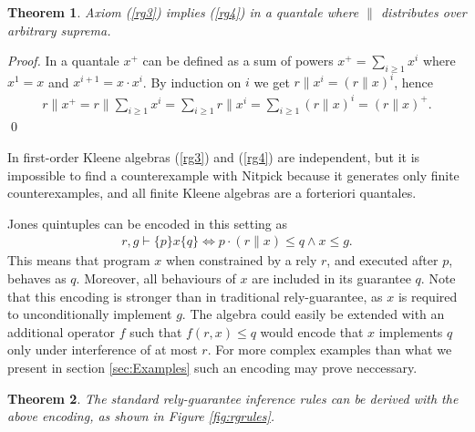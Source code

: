 \documentclass{llncs}
\newtheorem{thm}{Theorem}
\begin{document}
\begin{thm}
  Axiom (\ref{rg3}) implies (\ref{rg4}) in a quantale
  where $\|$ distributes over arbitrary suprema.
\end{thm}
\begin{proof}
  In a quantale $x^+$ can be defined as a sum of powers
  $x^+=\sum_{i\ge 1} x^i$ where $x^1=x$ and $x^{i+1}=x\cdot x^i$. By
  induction on $i$ we get $r\|x^i = (r\|x)^i$, hence
  \begin{align*}
    r\|x^+ = r\|\sum_{i\ge 1} x^i = \sum_{i\ge 1} r\|x^i = \sum_{i\ge 1} (r\|x)^i = (r\|x)^+.
  \end{align*}
  \qed
\end{proof}

In first-order Kleene algebras (\ref{rg3}) and (\ref{rg4}) are
independent, but it is impossible to find a counterexample with
Nitpick because it generates only finite counterexamples, and all
finite Kleene algebras are a forteriori quantales.

Jones quintuples can be encoded in this setting as
\begin{align}
r, g \vdash \{p\} x \{q\} \iff p\cdot(r\|x) \le q \land x \le g. \label{quin}
\end{align}
This means that program $x$ when constrained by a rely $r$, and
executed after $p$, behaves as $q$. Moreover, all behaviours of $x$
are included in its guarantee $q$. Note that this encoding is stronger
than in traditional rely-guarantee, as $x$ is required to
unconditionally implement $g$. The algebra could easily be extended
with an additional operator $f$ such that $f(r,x) \le q$ would encode
that $x$ implements $q$ only under interference of at most $r$. For
more complex examples than what we present in section
\ref{sec:Examples} such an encoding may prove neccessary.

\begin{thm}
  The standard rely-guarantee inference rules can be derived with the
  above encoding, as shown in Figure \ref{fig:rgrules}.
\end{thm}
\end{document}
